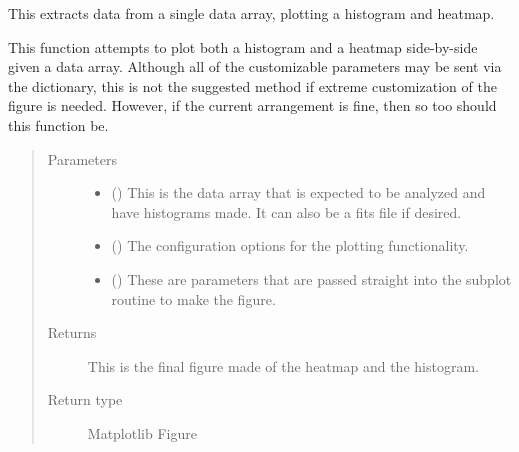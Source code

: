 \documentclass[letterpaper,10pt,english]{sphinxmanual}
\begin{document}
\begin{fulllineitems}
\label{\detokenize{python_docstrings/IfA_Smeargle.oscar.multi_figure:IfA_Smeargle.oscar.multi_figure.plot_single_heatmap_and_histogram}}
This extracts data from a single data array, plotting a histogram
and heatmap.

This function attempts to plot both a histogram and a heatmap
side-by-side given a data array. Although all of the customizable
parameters may be sent via the dictionary, this is not the suggested
method if extreme customization of the figure is needed. However, if the
current arrangement is fine, then so too should this function be.
\begin{quote}\begin{description}
\item[{Parameters}] \leavevmode\begin{itemize}
\item {} 
 () \textendash{} This is the data array that is expected to be analyzed and have
histograms made. It can also be a fits file if desired.

\item {} 
 ({\hyperref[\detokenize{python_docstrings/IfA_Smeargle.yankee.yankee_main:IfA_Smeargle.yankee.yankee_main.SmeargleConfig}]{}}\sphinxstyleliteralemphasis{\sphinxupquote{ (}}\sphinxstyleliteralemphasis{\sphinxupquote{)}}) \textendash{} The configuration options for the plotting functionality.

\item {} 
 () \textendash{} These are parameters that are passed straight into the subplot
routine to make the figure.

\end{itemize}

\item[{Returns}] \leavevmode
{} \textendash{} This is the final figure made of the heatmap and the histogram.

\item[{Return type}] \leavevmode
Matplotlib Figure

\end{description}\end{quote}

\end{fulllineitems}
\end{document}
